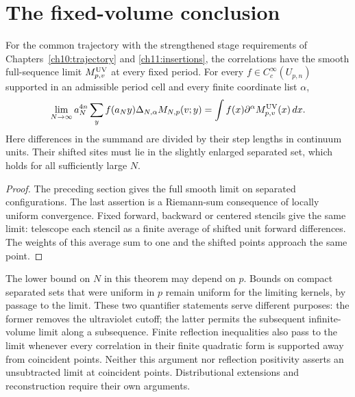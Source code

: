 \section{The fixed-volume conclusion}
\label{ch12:conclusion}

\begin{theorem}
\label{ch12:uv-theorem}
For the common trajectory with the strengthened stage
requirements of Chapters~\ref{ch10:trajectory} and
\ref{ch11:insertions}, the correlations have the smooth
full-sequence limit
$M^{\rm UV}_{p,v}$ at every fixed period. For every
$f\in C_c^\infty(U_{p,n})$ supported in an admissible period cell
and every finite coordinate list $\alpha$,
\[
 \lim_{N\to\infty}a_N^{4n}\sum_{y}
    f(a_Ny)\Delta_{N,\alpha}M_{N,p}(v;y)
       =\int f(x)\partial^\alpha M^{\rm UV}_{p,v}(x)\,dx.
\]
Here differences in the summand are divided by their step
lengths in continuum units. Their shifted sites must lie in the slightly enlarged
separated set, which holds for all sufficiently large $N$.
\end{theorem}
\begin{proof}
The preceding section gives the full smooth limit on separated configurations.
The last assertion is a Riemann-sum consequence of locally uniform
convergence. Fixed forward, backward or centered stencils give the
same limit: telescope each stencil as a finite average of shifted
unit forward differences. The weights of this average sum to one and the
shifted points approach the same point.
\end{proof}

The lower bound on $N$ in this theorem may depend on $p$. Bounds
on compact separated sets that were uniform in $p$ remain uniform
for the limiting kernels, by passage to the limit. These two
quantifier statements serve different purposes: the former removes
the ultraviolet cutoff; the latter permits the subsequent
infinite-volume limit along a subsequence. Finite reflection inequalities also pass
to the limit whenever every correlation in their finite quadratic
form is supported away from coincident points. Neither this argument nor
reflection positivity asserts an unsubtracted limit at coincident
points. Distributional extensions and reconstruction require their
own arguments.
